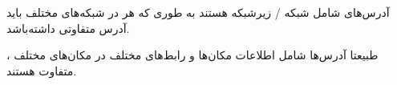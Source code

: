 \begin{boxK}
    آدرس‌های
    شامل شبکه / زیرشبکه هستند
    به طوری که هر 
    در شبکه‌های مختلف باید آدرس متفاوتی داشته‌باشد.

    طبیعتا آدرس‌ها شامل اطلاعات مکان‌ها و رابط‌های مختلف در مکان‌های مختلف ، متفاوت هستند.
    
\end{boxK}